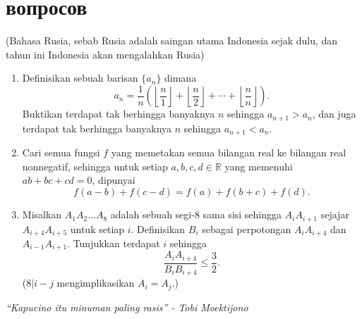 \documentclass{article}
\begin{document}
	\section{вопросов}
	(Bahasa Rusia, sebab Rusia adalah saingan utama Indonesia sejak dulu, dan tahun ini Indonesia akan mengalahkan Rusia)
	\vspace{1em}
	\begin{enumerate}
		\item Definisikan sebuah barisan $\{ a_n \}$ dimana \[ a_n = \frac{1}{n} \left( \left\lfloor \frac{n}{1} \right\rfloor + \left\lfloor \frac{n}{2} \right\rfloor + \dotsb + \left\lfloor \frac{n}{n} \right\rfloor \right). \] Buktikan terdapat tak berhingga banyaknya $n$ sehingga $a_{n + 1} > a_n$, dan juga terdapat tak berhingga banyaknya $n$ sehingga $a_{n + 1} < a_n$.
		\item Cari semua fungsi $f$ yang memetakan semua bilangan real ke bilangan real nonnegatif, sehingga untuk setiap $a, b, c, d \in \mathbb{R}$ yang memenuhi $ab + bc + cd = 0$, dipunyai \[ f(a - b) + f(c - d) = f(a) + f(b + c) + f(d).\]
		\item %
		Misalkan $A_1A_2\dotso A_8$ adalah sebuah segi-8 sama sisi sehingga $A_iA_{i+1}$ sejajar $A_{i+4}A_{i+5}$ untuk setiap $i$. Definisikan $B_i$ sebagai perpotongan $A_iA_{i+4}$ dan $A_{i-1}A_{i+1}$. Tunjukkan terdapat $i$ sehingga \[\frac{A_iA_{i+4}}{B_iB_{i+4}} \le \frac{3}{2}.\] ($8 | i - j$ mengimplikasikan $A_i = A_j$.)
	\end{enumerate}
	\begin{center}
		\textit{``Kapucino itu minuman paling rasis'' - Tobi Moektijono}
	\end{center}
\end{document}
